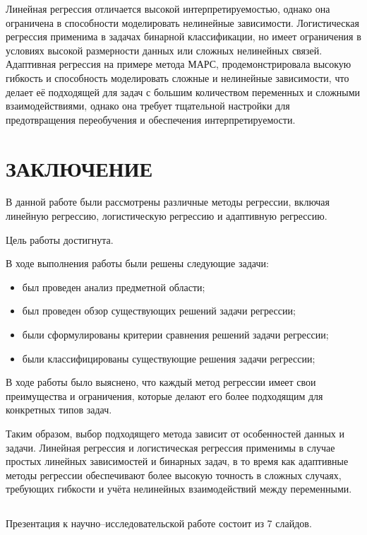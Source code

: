 Линейная регрессия отличается высокой интерпретируемостью, однако она ограничена в способности моделировать нелинейные зависимости.
Логистическая регрессия применима в задачах бинарной классификации, но имеет ограничения в условиях высокой размерности данных или сложных нелинейных связей.
Адаптивная регрессия на примере метода МАРС, продемонстрировала высокую гибкость и способность моделировать сложные и нелинейные зависимости, что делает её подходящей для задач с большим количеством переменных и сложными взаимодействиями, однако она требует тщательной настройки для предотвращения переобучения и обеспечения интерпретируемости.


\chapter*{ЗАКЛЮЧЕНИЕ}

В данной работе были рассмотрены различные методы регрессии, включая линейную регрессию, логистическую регрессию и адаптивную регрессию.

Цель работы достигнута.

В ходе выполнения работы были решены следующие задачи:
\begin{itemize}
    \item был проведен анализ предметной области;
    \item был проведен обзор существующих решений задачи регрессии;
    \item были сформулированы критерии сравнения решений задачи регрессии;
    \item были классифицированы существующие решения задачи регрессии;
\end{itemize}

В ходе работы было выяснено, что каждый метод регрессии имеет свои преимущества и ограничения, которые делают его более подходящим для конкретных типов задач.

Таким образом, выбор подходящего метода зависит от особенностей данных и задачи.
Линейная регрессия и логистическая регрессия применимы в случае простых линейных зависимостей и бинарных задач, в то время как адаптивные методы регрессии обеспечивают более высокую точность в сложных случаях, требующих гибкости и учёта нелинейных взаимодействий между переменными.


\begin{appendices}
    \chapter{}
    Презентация к научно--исследовательской работе состоит из 7 слайдов.
\end{appendices}

